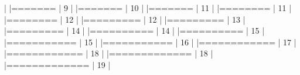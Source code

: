 \documentclass{article}
\begin{document}
\begin{Schunk}
\begin{Soutput}
  |                                                                            
  |=======                                                               |   9%
  |                                                                            
  |=======                                                               |  10%
  |                                                                            
  |=======                                                               |  11%
  |                                                                            
  |========                                                              |  11%
  |                                                                            
  |========                                                              |  12%
  |                                                                            
  |=========                                                             |  12%
  |                                                                            
  |=========                                                             |  13%
  |                                                                            
  |=========                                                             |  14%
  |                                                                            
  |==========                                                            |  14%
  |                                                                            
  |==========                                                            |  15%
  |                                                                            
  |===========                                                           |  15%
  |                                                                            
  |===========                                                           |  16%
  |                                                                            
  |============                                                          |  17%
  |                                                                            
  |============                                                          |  18%
  |                                                                            
  |=============                                                         |  18%
  |                                                                            
  |=============                                                         |  19%
  |                                                                            

\end{Soutput}
\end{Schunk}
\end{document}
